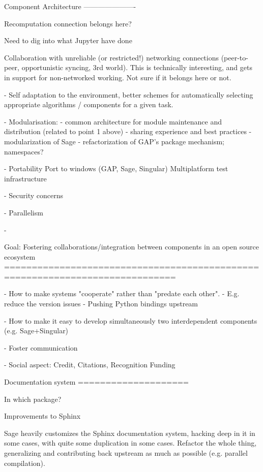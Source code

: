 \begin{Workpackage}{\thewpno}
Component Architecture
----------------------

Recomputation connection belongs here?

Need to dig into what Jupyter have done

Collaboration with unreliable (or restricted!) networking connections
(peer-to-peer, opportunistic syncing, 3rd world). This is technically
interesting, and gets in support for non-networked working. Not sure
if it belongs here or not.

- Self adaptation to the environment, better schemes for automatically
  selecting appropriate algorithms / components for a given task.

- Modularisation:
  - common architecture for module maintenance and distribution
    (related to point 1 above)
  - sharing experience and best practices
  - modularization of Sage
  - refactorization of GAP's package mechanism; namespaces?

- Portability
  Port to windows (GAP, Sage, Singular)
  Multiplatform test infrastructure

- Security concerns

- Parallelism

- 


Goal: Fostering collaborations/integration between components in an open source ecosystem
=============================================================================

- How to make systems "cooperate" rather than "predate each other".
- E.g. reduce the version issues
- Pushing Python bindings upstream

- How to make it easy to develop simultaneously two interdependent
  components (e.g. Sage+Singular)

- Foster communication

- Social aspect:
  Credit, Citations, Recognition
  Funding

Documentation system
====================

In which package?

Improvements to Sphinx

Sage heavily customizes the Sphinx documentation system, hacking deep
in it in some cases, with quite some duplication in some cases.
Refactor the whole thing, generalizing and contributing back upstream
as much as possible (e.g. parallel compilation).

\end{Workpackage}
